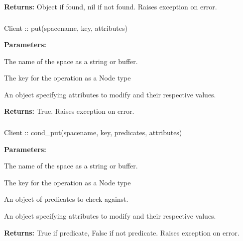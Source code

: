 \noindent\textbf{Returns:}
Object if found, nil if not found.  Raises exception on error.

\subsubsection{}
\label{api:nodejs:put}
\begin{javascriptcode}
Client :: put(spacename, key, attributes)
\end{javascriptcode}
\funcdesc 

\noindent\textbf{Parameters:}
\begin{description}[labelindent=\widthof{{\code{attributes}}},leftmargin=*,noitemsep,nolistsep,align=right]
\item[\code{spacename}] The name of the space as a string or buffer.
\item[\code{key}] The key for the operation as a Node type
\item[\code{attributes}] An object specifying attributes to modify and their respective values.
\end{description}

\noindent\textbf{Returns:}
True.  Raises exception on error.

\subsubsection{}
\label{api:nodejs:cond_put}
\begin{javascriptcode}
Client :: cond_put(spacename, key, predicates, attributes)
\end{javascriptcode}
\funcdesc 

\noindent\textbf{Parameters:}
\begin{description}[labelindent=\widthof{{\code{predicates}}},leftmargin=*,noitemsep,nolistsep,align=right]
\item[\code{spacename}] The name of the space as a string or buffer.
\item[\code{key}] The key for the operation as a Node type
\item[\code{predicates}] An object of predicates to check against.
\item[\code{attributes}] An object specifying attributes to modify and their respective values.
\end{description}

\noindent\textbf{Returns:}
True if predicate, False if not predicate.  Raises exception on error.

